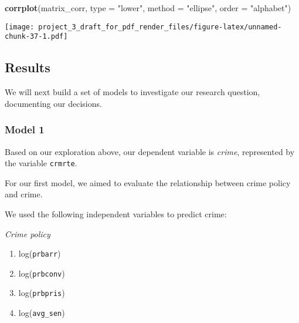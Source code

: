\documentclass[]{article}
\newenvironment{Shaded}{\begin{snugshade}}{\end{snugshade}}
\newcommand{\DataTypeTok}[1]{\textcolor[rgb]{0.13,0.29,0.53}{#1}}
\newcommand{\DecValTok}[1]{\textcolor[rgb]{0.00,0.00,0.81}{#1}}
\newcommand{\KeywordTok}[1]{\textcolor[rgb]{0.13,0.29,0.53}{\textbf{#1}}}
\newcommand{\NormalTok}[1]{#1}
\newcommand{\OperatorTok}[1]{\textcolor[rgb]{0.81,0.36,0.00}{\textbf{#1}}}
\newcommand{\StringTok}[1]{\textcolor[rgb]{0.31,0.60,0.02}{#1}}
\begin{document}
\begin{Shaded}
\end{Shaded}

\begin{Shaded}
\begin{Highlighting}[]
\KeywordTok{corrplot}\NormalTok{(matrix_corr, }\DataTypeTok{type =} \StringTok{"lower"}\NormalTok{, }\DataTypeTok{method =} \StringTok{"ellipse"}\NormalTok{, }\DataTypeTok{order =} \StringTok{"alphabet"}\NormalTok{)}
\end{Highlighting}
\end{Shaded}

\texttt{[image: project\_3\_draft\_for\_pdf\_render\_files/figure-latex/unnamed-chunk-37-1.pdf]}

\hypertarget{results}{%
\subsection{Results}\label{results}}

We will next build a set of models to investigate our research question,
documenting our decisions.

\hypertarget{model-1}{%
\subsubsection{Model 1}\label{model-1}}

Based on our exploration above, our dependent variable is \emph{crime},
represented by the variable \texttt{crmrte}.

For our first model, we aimed to evaluate the relationship between crime
policy and crime.

We used the following independent variables to predict crime:

\emph{Crime policy}

\begin{enumerate}
\def\labelenumi{(\arabic{enumi})}
\item
  log(\texttt{prbarr})
\item
  log(\texttt{prbconv})
\item
  log(\texttt{prbpris})
\item
  log(\texttt{avg\_sen})
\end{enumerate}
\end{document}
